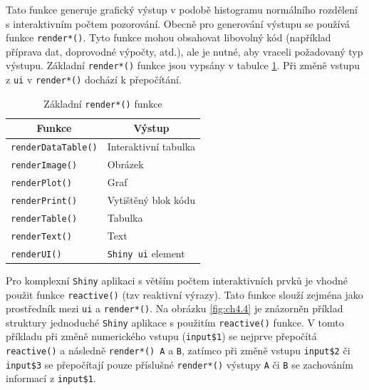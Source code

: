 \documentclass[12pt,]{article}
\newenvironment{Shaded}{\begin{snugshade}}{\end{snugshade}}
\newcommand{\KeywordTok}[1]{\textcolor[rgb]{0.13,0.29,0.53}{\textbf{#1}}}
\newcommand{\DecValTok}[1]{\textcolor[rgb]{0.00,0.00,0.81}{#1}}
\newcommand{\StringTok}[1]{\textcolor[rgb]{0.31,0.60,0.02}{#1}}
\newcommand{\OperatorTok}[1]{\textcolor[rgb]{0.81,0.36,0.00}{\textbf{#1}}}
\newcommand{\NormalTok}[1]{#1}
\begin{document}
\begin{Shaded}
\end{Shaded}

Tato funkce generuje grafický výstup v podobě histogramu normálního
rozdělení s interaktivním počtem pozorování. Obecně pro generování
výstupu se používá funkce \texttt{render*()}. Tyto funkce mohou
obsahovat libovolný kód (například příprava dat, doprovodné výpočty,
atd.), ale je nutné, aby vraceli požadovaný typ výstupu. Základní
\texttt{render*()} funkce jsou vypsány v tabulce \ref{tab5}. Při změně
vstupu z \texttt{ui} v \texttt{render*()} dochází k přepočítání.

\begin{table}[H]
\centering
\begin{tabular}{|l|l|}
\hline
\multicolumn{1}{|c|}{Funkce} & \multicolumn{1}{c|}{Výstup} \\ \hline
\texttt{renderDataTable()}   & Interaktivní tabulka        \\ \hline
\texttt{renderImage()}       & Obrázek                     \\ \hline
\texttt{renderPlot()}        & Graf                        \\ \hline
\texttt{renderPrint()}       & Vytištěný blok kódu         \\ \hline
\texttt{renderTable()}       & Tabulka                     \\ \hline
\texttt{renderText()}        & Text                        \\ \hline
\texttt{renderUI()}          & \texttt{Shiny ui} element   \\ \hline
\end{tabular}
\caption{Základní \texttt{render*()} funkce}
\label{tab5}
\end{table}

\vspace*{-0.7cm}

\qquad Pro komplexní \texttt{Shiny} aplikaci s větším počtem
interaktivních prvků je vhodné použit funkce \texttt{reactive()} (tzv
reaktivní výrazy). Tato funkce slouží zejména jako prostředník mezi
\texttt{ui} a \texttt{render*()}. Na obrázku \ref{fig:ch4.4} je
znázorněn příklad struktury jednoduché \texttt{Shiny} aplikace s
použitím \texttt{reactive()} funkce. V tomto příkladu při změně
numerického vstupu (\texttt{input\$1}) se nejprve přepočítá
\texttt{reactive()} a následně \texttt{render*()\ A} a \texttt{B},
zatímco při změně vstupu \texttt{input\$2} či \texttt{input\$3} se
přepočítají pouze příslušné \texttt{render*()} výstupy \texttt{A} či
\texttt{B} se zachováním informací z \texttt{input\$1}.
\vspace*{-0.15cm}
\end{document}
